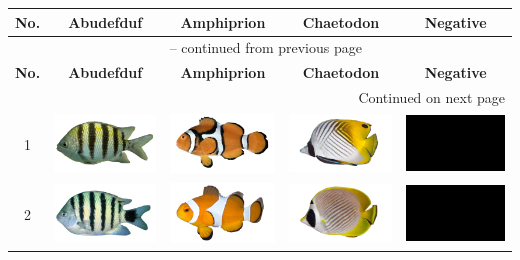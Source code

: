 \begin{longtable}{|c|c|c|c|c|}
    \hline
    \textbf{No.} & \textbf{Abudefduf} & \textbf{Amphiprion} & \textbf{Chaetodon} & \textbf{Negative} \\
    \hline
    \endfirsthead
    \multicolumn{5}{c}{{\tablename\ \thetable{} -- continued from previous page}} \\
    \hline
    \textbf{No.} & \textbf{Abudefduf} & \textbf{Amphiprion} & \textbf{Chaetodon} & \textbf{Negative} \\
    \hline
    \endhead
    \hline \multicolumn{5}{|r|}{{Continued on next page}} \\ \hline
    \endfoot
    \hline
    \endlastfoot

    1 & \includegraphics[width=3cm]{gambar/abudefduf/A1} & \includegraphics[width=3cm]{gambar/amphiprion/A1} & \includegraphics[width=3cm]{gambar/chaetodon/C1} & \includegraphics[width=3cm]{gambar/negative_examples/N1} \\
    \hline
    2 & \includegraphics[width=3cm]{gambar/abudefduf/A2} & \includegraphics[width=3cm]{gambar/amphiprion/A2} & \includegraphics[width=3cm]{gambar/chaetodon/C2} & \includegraphics[width=3cm]{gambar/negative_examples/N2} \\

\end{longtable}
